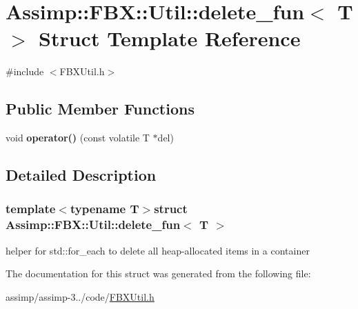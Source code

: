 \hypertarget{struct_assimp_1_1_f_b_x_1_1_util_1_1delete__fun}{\section{Assimp\+:\+:F\+B\+X\+:\+:Util\+:\+:delete\+\_\+fun$<$ T $>$ Struct Template Reference}
\label{struct_assimp_1_1_f_b_x_1_1_util_1_1delete__fun}
}


{\ttfamily \#include $<$F\+B\+X\+Util.\+h$>$}

\subsection*{Public Member Functions}
\begin{DoxyCompactItemize}
\item 
\hypertarget{struct_assimp_1_1_f_b_x_1_1_util_1_1delete__fun_a06878c4b6c4e3f8c8a6be5c608827df7}{void {\bfseries operator()} (const volatile T $\ast$del)}\label{struct_assimp_1_1_f_b_x_1_1_util_1_1delete__fun_a06878c4b6c4e3f8c8a6be5c608827df7}

\end{DoxyCompactItemize}


\subsection{Detailed Description}
\subsubsection*{template$<$typename T$>$struct Assimp\+::\+F\+B\+X\+::\+Util\+::delete\+\_\+fun$<$ T $>$}

helper for std\+::for\+\_\+each to delete all heap-\/allocated items in a container 

The documentation for this struct was generated from the following file\+:\begin{DoxyCompactItemize}
\item 
assimp/assimp-\/3../code/\hyperlink{_f_b_x_util_8h}{F\+B\+X\+Util.\+h}\end{DoxyCompactItemize}
